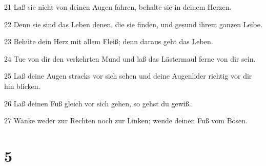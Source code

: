 \par 21 Laß sie nicht von deinen Augen fahren, behalte sie in deinem Herzen.
\par 22 Denn sie sind das Leben denen, die sie finden, und gesund ihrem ganzen Leibe.
\par 23 Behüte dein Herz mit allem Fleiß; denn daraus geht das Leben.
\par 24 Tue von dir den verkehrten Mund und laß das Lästermaul ferne von dir sein.
\par 25 Laß deine Augen stracks vor sich sehen und deine Augenlider richtig vor dir hin blicken.
\par 26 Laß deinen Fuß gleich vor sich gehen, so gehst du gewiß.
\par 27 Wanke weder zur Rechten noch zur Linken; wende deinen Fuß vom Bösen.

\chapter{5}

